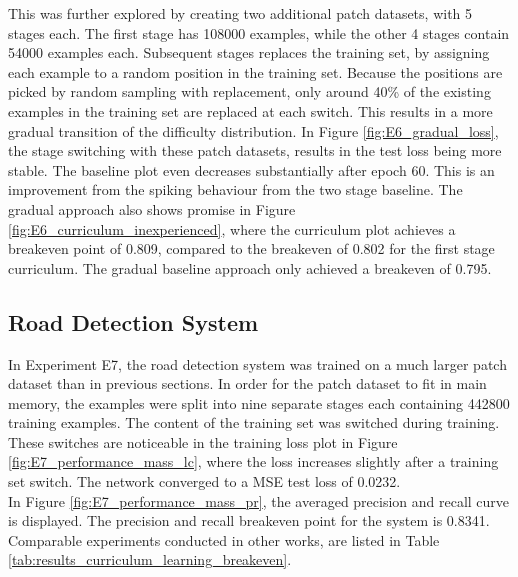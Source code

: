 This was further explored by creating two additional patch datasets, with 5 stages each. The first stage has 108000 examples, while the other 4 stages contain 54000 examples each. Subsequent stages replaces the training set, by assigning each example to a random position in the training set. Because the positions are picked by random sampling with replacement, only around 40\% of the existing examples in the training set are replaced at each switch. This results in a more gradual transition of the difficulty distribution. In Figure \ref{fig:E6_gradual_loss}, the stage switching with these patch datasets, results in the test loss being more stable.
The baseline plot even decreases substantially after epoch 60. This is an improvement from the spiking behaviour from the two stage baseline. The gradual approach also shows promise in Figure \ref{fig:E6_curriculum_inexperienced}, where the curriculum plot achieves a breakeven point of 0.809, compared to the breakeven of 0.802 for the first stage curriculum. The gradual baseline approach only achieved a breakeven of 0.795.\\

\subsection{Road Detection System}
\label{sec:results_road_detection_system}
In Experiment E7, the road detection system was trained on a much larger patch dataset than in previous sections. In order for the patch dataset to fit in main memory, the examples were split into nine separate stages each containing 442800 training examples. The content of the training set was switched during training. These switches are noticeable in the training loss plot in Figure \ref{fig:E7_performance_mass_lc}, where the loss increases slightly after a training set switch. The network converged to a \ac{MSE} test loss of 0.0232. \\

In Figure \ref{fig:E7_performance_mass_pr}, the averaged precision and recall curve is displayed. The precision and recall breakeven point for the system is 0.8341. Comparable experiments conducted in other works, are listed in Table \ref{tab:results_curriculum_learning_breakeven}.\\

